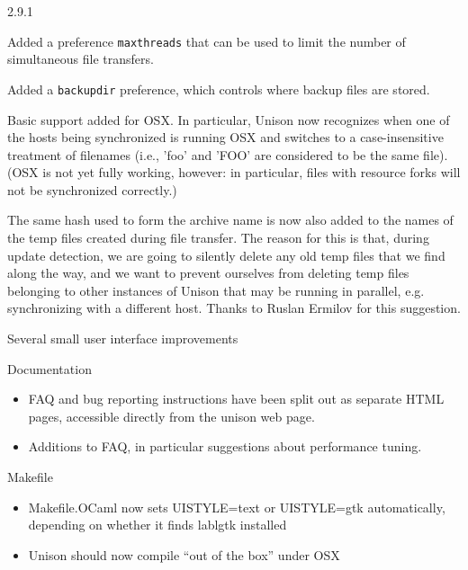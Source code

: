 \begin{changesfromversion}{2.9.1}
\item Added a preference {\tt maxthreads} that can be used to limit the
number of simultaneous file transfers.
\item Added a {\tt backupdir} preference, which controls where backup
files are stored.
\item Basic support added for OSX.  In particular, Unison now recognizes
when one of the hosts being synchronized is running OSX and switches to
a case-insensitive treatment of filenames (i.e., 'foo' and 'FOO' are
considered to be the same file).
  (OSX is not yet fully working,
  however: in particular, files with resource forks will not be
  synchronized correctly.)
\item The same hash used to form the archive name is now also added to
the names of the temp files created during file transfer.  The reason for
this is that, during update detection, we are going to silently delete
any old temp files that we find along the way, and we want to prevent
ourselves from deleting temp files belonging to other instances of Unison
that may be running in parallel, e.g. synchronizing with a different
host.  Thanks to Ruslan Ermilov for this suggestion.
\item Several small user interface improvements
\item Documentation
\begin{itemize}
\item FAQ and bug reporting instructions have been split out as separate
      HTML pages, accessible directly from the unison web page.
\item Additions to FAQ, in particular suggestions about performance
tuning. 
\end{itemize}
\item Makefile
\begin{itemize}
\item Makefile.OCaml now sets UISTYLE=text or UISTYLE=gtk automatically,
  depending on whether it finds lablgtk installed
\item Unison should now compile ``out of the box'' under OSX
\end{itemize}
\end{changesfromversion}

